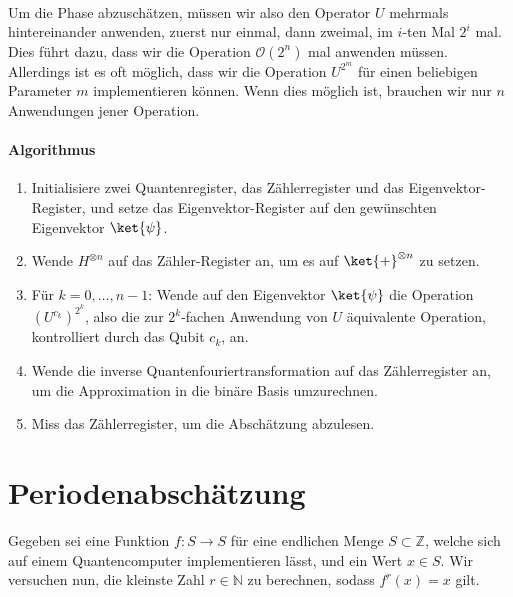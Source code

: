 \paragraph{}

Um die Phase abzuschätzen, müssen wir also den Operator $U$ mehrmals hintereinander anwenden, zuerst nur einmal, dann zweimal, im $i$-ten Mal $2^i$ mal. Dies führt dazu, dass wir die Operation $\mathcal O(2^n)$ mal anwenden müssen. Allerdings ist es oft möglich, dass wir die Operation $U^{2^m}$ für einen beliebigen Parameter $m$ implementieren können. Wenn dies möglich ist, brauchen wir nur $n$ Anwendungen jener Operation.

\paragraph{Algorithmus}
\begin{enumerate}
    \item Initialisiere zwei Quantenregister, das Zählerregister und das Eigenvektor-Register, und setze das Eigenvektor-Register auf den gewünschten Eigenvektor $\ket{\psi}$.
    \item Wende $H^{\otimes n}$ auf das Zähler-Register an, um es auf $\ket{+}^{\otimes n}$ zu setzen.
    \item Für $k = 0, \dots, n - 1$: Wende auf den Eigenvektor $\ket{\psi}$ die Operation $(U^{c_k})^{2^k}$, also die zur $2^k$-fachen Anwendung von $U$ äquivalente Operation, kontrolliert durch das Qubit $c_k$, an.
    \item Wende die inverse Quantenfouriertransformation auf das Zählerregister an, um die Approximation in die binäre Basis umzurechnen.
    \item Miss das Zählerregister, um die Abschätzung abzulesen.
\end{enumerate}
\paragraph{}

\paragraph{}

\section{Periodenabschätzung}
Gegeben sei eine Funktion $f : S \rightarrow S$ für eine endlichen Menge $S \subset \mathbb{Z}$, welche sich auf einem Quantencomputer implementieren lässt, und ein Wert $x \in S$. Wir versuchen nun, die kleinste Zahl $r \in \mathbb{N}$ zu berechnen, sodass $f^r(x) = x$ gilt.
